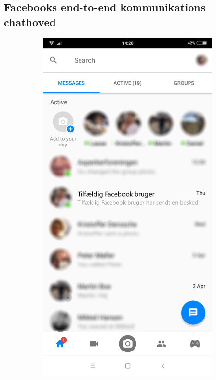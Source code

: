 \subsection{Facebooks end-to-end kommunikations chathoved}
\label{appendix:facebookchat}
\begin{figure}[H]
    \begin{subfigure}{0.33\textwidth}
        \centering
        \includegraphics[scale=0.15]{Projectdoc/Problemanalyse/Illustrationer/1-fbchat.png} 

\end{subfigure}
\end{figure}
